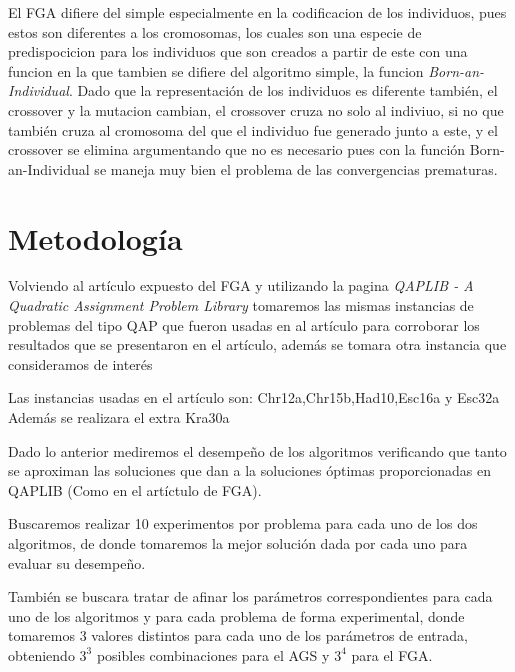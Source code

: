 \documentclass[12pts,letterpaper]{article}
\begin{document}
		El FGA difiere del simple especialmente 
		en la codificacion de los individuos, pues estos son diferentes a los cromosomas,
		los cuales son una especie de predispocicion para los individuos que son creados
		a partir de este con una funcion en la que tambien se difiere del algoritmo simple,
		la funcion \emph{Born-an-Individual}. Dado que la representación de los individuos es
		diferente también, el crossover y la mutacion cambian, el crossover cruza no
		solo al indiviuo, si no que también cruza al cromosoma del que el individuo 
		fue generado junto a este, y el crossover se elimina argumentando que no es
		necesario pues con la función Born-an-Individual se maneja muy bien el 
		problema de las convergencias prematuras.
		


	\section{Metodología}

		Volviendo al artículo expuesto del FGA y utilizando la pagina 
		\emph{QAPLIB - A Quadratic Assignment Problem Library} tomaremos las mismas
		instancias de problemas del tipo QAP que fueron usadas en al artículo para
		corroborar los resultados que se presentaron en el artículo, además se tomara
		otra instancia que consideramos de interés
		
		Las instancias usadas en el artículo son: Chr12a,Chr15b,Had10,Esc16a y 
		Esc32a\\
		Además se realizara el extra Kra30a
		
		Dado lo anterior mediremos el desempeño de los algoritmos verificando que
		tanto se aproximan las soluciones que dan a la soluciones óptimas 
		proporcionadas en QAPLIB (Como en el artíctulo de FGA).
		
		Buscaremos realizar 10 experimentos por problema para cada uno de los
		dos algoritmos, de donde tomaremos la mejor solución dada por cada uno
		para evaluar su desempeño.
		
		También se buscara tratar de afinar los parámetros correspondientes para
		cada uno de los algoritmos y para cada problema de forma experimental, donde
		tomaremos 3 valores distintos para cada uno de los parámetros de entrada,
		obteniendo $3^{3}$ posibles combinaciones para el AGS y $3^{4}$ para el FGA.
		
\end{document}
